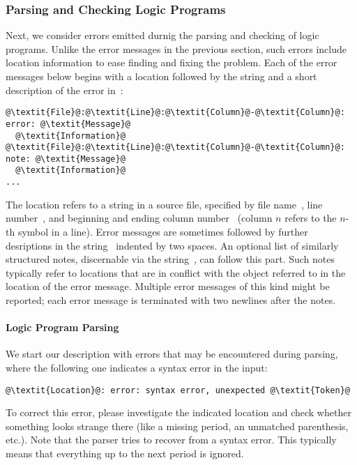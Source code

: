 \subsubsection{Parsing and Checking Logic Programs}\label{subsec:error:parselp}

Next, we consider errors emitted durnig the parsing and checking of logic programs.
Unlike the error messages in the previous section, 
such errors include location information to ease finding and fixing the problem.
Each of the error messages below begins with a location followed by the string  and a short description of the error in~:
\begin{lstlisting}[numbers=none,escapechar=@]
@\textit{File}@:@\textit{Line}@:@\textit{Column}@-@\textit{Column}@: error: @\textit{Message}@
  @\textit{Information}@
@\textit{File}@:@\textit{Line}@:@\textit{Column}@-@\textit{Column}@: note: @\textit{Message}@
  @\textit{Information}@
...

\end{lstlisting}
The location refers to a string in a source file,
specified by file name~,
line number~,
and beginning and ending column number~
(column $n$ refers to the $n$-th symbol in a line).
Error messages are sometimes followed by further desriptions in the string~ indented by two spaces.
An optional list of similarly structured notes, discernable via the string~, can follow this part.
Such notes typically refer to locations that are in conflict with the object referred to in the location of the error message.
Multiple error messages of this kind might be reported;
each error message is terminated with two newlines after the notes.

\paragraph{Logic Program Parsing}
We start our description with errors that may be encountered during parsing,
where the following one indicates a syntax error in the input:
%
\begin{lstlisting}[numbers=none,escapechar=@]
@\textit{Location}@: error: syntax error, unexpected @\textit{Token}@
\end{lstlisting}
%
To correct this error, please investigate the indicated location
and check whether something looks strange there
(like a missing period, an unmatched parenthesis, etc.).
Note that the parser tries to recover from a syntax error.
This typically means that everything up to the next period is ignored.

